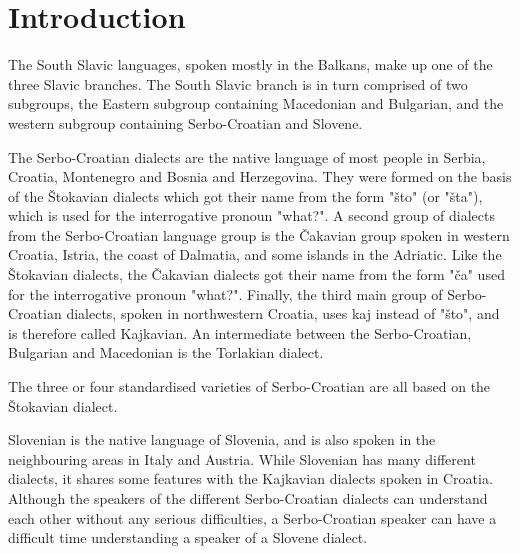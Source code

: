 \section{Introduction}

The South Slavic languages, spoken mostly in the Balkans, make up one of the three Slavic 
branches. The South Slavic branch is in turn comprised of two subgroups, the Eastern 
subgroup containing Macedonian and Bulgarian, and the western subgroup containing 
Serbo-Croatian and Slovene.

The Serbo-Croatian dialects are the native language of most people in Serbia, Croatia, 
Montenegro and Bosnia and Herzegovina. They were formed on the basis of the Štokavian dialects 
which got their name from the form "što" (or "šta"), which is used for the interrogative pronoun "what?". A second group of dialects from the Serbo-Croatian language group is the Čakavian group spoken in western Croatia, Istria, the coast of Dalmatia, and some islands in the Adriatic. Like the Štokavian dialects, the Čakavian dialects got their name from the form "ča" used for the interrogative pronoun "what?". Finally, the third main group of Serbo-Croatian dialects, spoken in northwestern Croatia, uses kaj instead of "što", and is therefore called Kajkavian.
An intermediate between the Serbo-Croatian, Bulgarian and Macedonian is the Torlakian dialect.

The three or four standardised varieties of Serbo-Croatian are all based on the Štokavian dialect.

Slovenian is the native language of Slovenia, and is also spoken in the neighbouring areas in Italy and Austria. While Slovenian has many different dialects, it shares some features with the Kajkavian dialects spoken in Croatia. Although the speakers of the different Serbo-Croatian dialects can understand each other without any serious difficulties, a Serbo-Croatian speaker can have a difficult time understanding a speaker of a Slovene dialect.


\begin{figure}


\end{figure}

